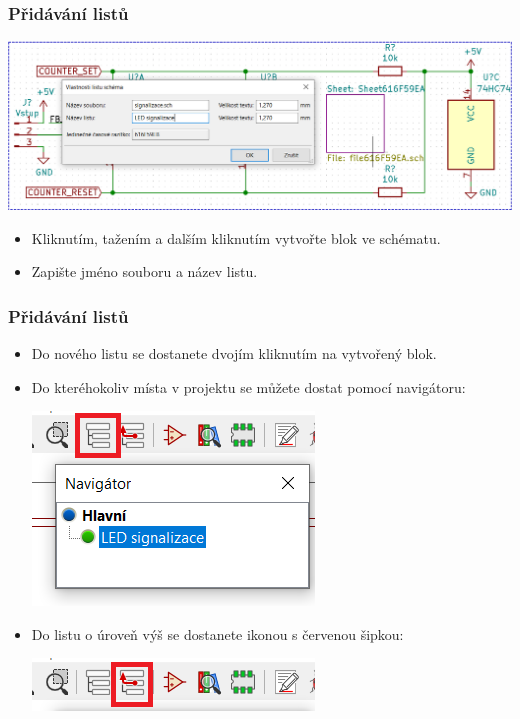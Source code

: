 \documentclass{beamer}
\begin{document}
\begin{frame}
	\frametitle{Přidávání listů}
	
	\begin{center}
		\includegraphics[width=\textwidth]{obr/dalsi_strana02.png}
	\end{center}
	
	\small
	
	\begin{itemize}
		\item Kliknutím, tažením a dalším kliknutím vytvořte blok ve schématu.
		\item Zapište jméno souboru a název listu.
	\end{itemize}
	
\end{frame}
\begin{frame}
	\frametitle{Přidávání listů}
	
	\begin{itemize}
		\item Do nového listu se dostanete dvojím kliknutím na vytvořený blok.
		\item Do kteréhokoliv místa v projektu se můžete dostat pomocí navigátoru:
			\begin{center}
				\includegraphics[scale=0.6]{obr/dalsi_strana03.png}
			\end{center}
		\item Do listu o úroveň výš se dostanete ikonou s červenou šipkou:
			\begin{center}
				\includegraphics[scale=0.6]{obr/dalsi_strana04.png}
			\end{center}
	\end{itemize}
	
\end{frame}
\end{document}
